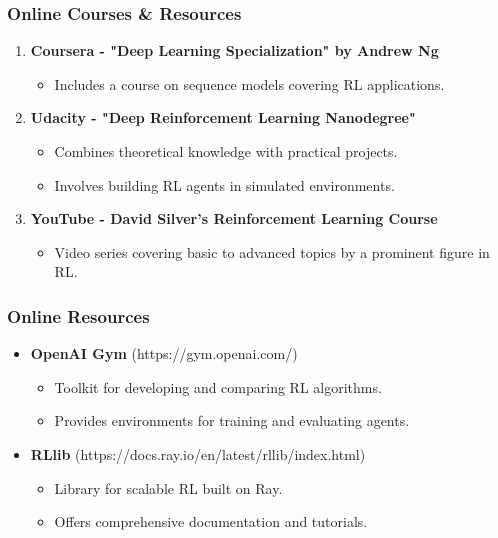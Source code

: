 \documentclass[aspectratio=169]{beamer}
\begin{document}
\begin{frame}[fragile]
    \frametitle{Online Courses & Resources}
    \begin{enumerate}
        \item \textbf{Coursera - "Deep Learning Specialization" by Andrew Ng}
        \begin{itemize}
            \item Includes a course on sequence models covering RL applications.
        \end{itemize}
        
        \item \textbf{Udacity - "Deep Reinforcement Learning Nanodegree"}
        \begin{itemize}
            \item Combines theoretical knowledge with practical projects.
            \item Involves building RL agents in simulated environments.
        \end{itemize}
        
        \item \textbf{YouTube - David Silver's Reinforcement Learning Course}
        \begin{itemize}
            \item Video series covering basic to advanced topics by a prominent figure in RL.
        \end{itemize}
    \end{enumerate}
\end{frame}

\begin{frame}[fragile]
    \frametitle{Online Resources}
    \begin{itemize}
        \item \textbf{OpenAI Gym} (https://gym.openai.com/)
        \begin{itemize}
            \item Toolkit for developing and comparing RL algorithms.
            \item Provides environments for training and evaluating agents.
        \end{itemize}

        \item \textbf{RLlib} (https://docs.ray.io/en/latest/rllib/index.html)
        \begin{itemize}
            \item Library for scalable RL built on Ray.
            \item Offers comprehensive documentation and tutorials.
        \end{itemize}
    \end{itemize}
\end{frame}
\end{document}
